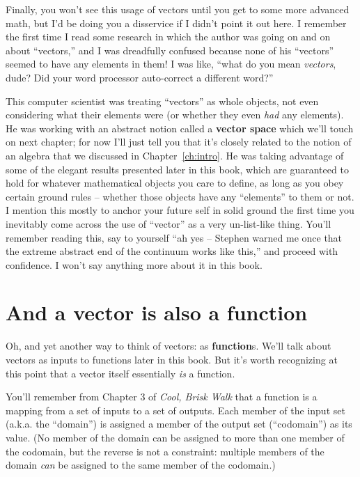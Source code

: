 Finally, you won't see this usage of vectors until you get to some more
advanced math, but I'd be doing you a disservice if I didn't point it out here.
I remember the first time I read some research in which the author was going on
and on about ``vectors,'' and I was dreadfully confused because none of his
``vectors'' seemed to have any elements in them! I was like, ``what do you mean
\textit{vectors}, dude? Did your word processor auto-correct a different
word?''


This computer scientist was treating ``vectors'' as whole objects, not even
considering what their elements were (or whether they even \textit{had} any
elements). He was working with an abstract notion called a \label{vectorSpace}
\textbf{vector space} which we'll touch on next chapter; for now I'll just tell
you that it's closely related to the notion of an algebra that we discussed in
Chapter~\ref{ch:intro}. He was taking advantage of some of the elegant results
presented later in this book, which are guaranteed to hold for whatever
mathematical objects you care to define, as long as you obey certain ground
rules -- whether those objects have any ``elements'' to them or not. I mention
this mostly to anchor your future self in solid ground the first time you
inevitably come across the use of ``vector'' as a very un-list-like thing.
You'll remember reading this, say to yourself ``ah yes -- Stephen warned me
once that the extreme abstract end of the continuum works like this,'' and
proceed with confidence. I won't say anything more about it in this book.

\section{And a vector is also a function}

\label{vectorIsFunction}

Oh, and yet another way to think of vectors: as \textbf{function}s. We'll talk
about vectors as inputs to functions later in this book. But it's worth
recognizing at this point that a vector itself essentially \textit{is} a
function.


You'll remember from Chapter 3 of \textit{Cool, Brisk Walk} that a function is
a mapping from a set of inputs to a set of outputs. Each member of the input
set (a.k.a. the ``domain'') is assigned a member of the output set
(``codomain'') as its value. (No member of the domain can be assigned to more
than one member of the codomain, but the reverse is not a constraint: multiple
members of the domain \textit{can} be assigned to the same member of the
codomain.)

